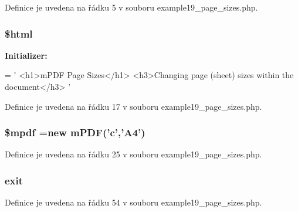 Definice je uvedena na řádku 5 v souboru example19\-\_\-page\-\_\-sizes.\-php.

\hypertarget{example19__page__sizes_8php_a6f96e7fc92441776c9d1cd3386663b40}{
\subsubsection[{\$html}]{\setlength{\rightskip}{0pt plus 5cm}\$html}}\label{example19__page__sizes_8php_a6f96e7fc92441776c9d1cd3386663b40}
{\bfseries Initializer\-:}
\begin{DoxyCode}
= \textcolor{stringliteral}{'}
\textcolor{stringliteral}{<h1>mPDF Page Sizes</h1>}
\textcolor{stringliteral}{<h3>Changing page (sheet) sizes within the document</h3>}
\textcolor{stringliteral}{'}
\end{DoxyCode}


Definice je uvedena na řádku 17 v souboru example19\-\_\-page\-\_\-sizes.\-php.

\hypertarget{example19__page__sizes_8php_ad028f81910d6cbab9b184d2214b3a8f8}{
\subsubsection[{\$mpdf}]{\setlength{\rightskip}{0pt plus 5cm}\$mpdf =new {\bf m\-P\-D\-F}('c','A4')}}\label{example19__page__sizes_8php_ad028f81910d6cbab9b184d2214b3a8f8}


Definice je uvedena na řádku 25 v souboru example19\-\_\-page\-\_\-sizes.\-php.

\hypertarget{example19__page__sizes_8php_a6733eb5f605d09eaede9845835d71c4e}{
\subsubsection[{exit}]{\setlength{\rightskip}{0pt plus 5cm}exit}}\label{example19__page__sizes_8php_a6733eb5f605d09eaede9845835d71c4e}


Definice je uvedena na řádku 54 v souboru example19\-\_\-page\-\_\-sizes.\-php.

